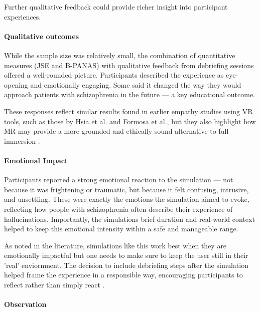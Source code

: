 Further qualitative feedback could provide richer insight into participant experiences.


\paragraph{Qualitative outcomes}
While the sample size was relatively small, the combination of quantitative measures (JSE and B-PANAS) with qualitative feedback from debriefing sessions offered a well-rounded picture. Participants described the experience as eye-opening and emotionally engaging. Some said it changed the way they would approach patients with schizophrenia in the future — a key educational outcome.

\vspace{1em}

These responses reflect similar results found in earlier empathy studies using VR tools, such as those by Hsia et al. and Formosa et al., but they also highlight how MR may provide a more grounded and ethically sound alternative to full immersion \cite{Hsia2022, Formosa2018}.

\paragraph{Emotional Impact}

Participants reported a strong emotional reaction to the simulation — not because it was frightening or traumatic, but because it felt confusing, intrusive, and unsettling. These were exactly the emotions the simulation aimed to evoke, reflecting how people with schizophrenia often describe their experience of hallucinations. Importantly, the simulations brief duration and real-world context helped to keep this emotional intensity within a safe and manageable range.

\vspace{1em}

As noted in the literature, simulations like this work best when they are emotionally impactful but one needs to make sure to keep the user still in their 'real' enviornment. The decision to include debriefing steps after the simulation helped frame the experience in a responsible way, encouraging participants to reflect rather than simply react \cite{Rueda2020, Ando2011}.

\paragraph{Observation}

